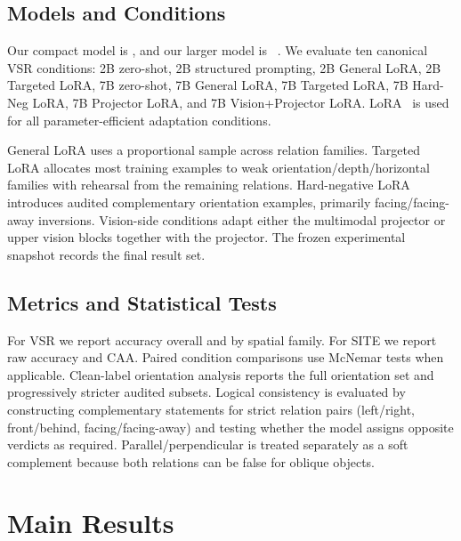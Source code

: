 \subsection{Models and Conditions}
Our compact model is \modelsmall{}, and our larger model is \modellarge{}~\cite{wang2024qwen2vl}. We evaluate ten canonical VSR conditions: 2B zero-shot, 2B structured prompting, 2B General LoRA, 2B Targeted LoRA, 7B zero-shot, 7B General LoRA, 7B Targeted LoRA, 7B Hard-Neg LoRA, 7B Projector LoRA, and 7B Vision+Projector LoRA. LoRA~\cite{hu2021lora} is used for all parameter-efficient adaptation conditions.

General LoRA uses a proportional sample across relation families. Targeted LoRA allocates most training examples to weak orientation/depth/horizontal families with rehearsal from the remaining relations. Hard-negative LoRA introduces audited complementary orientation examples, primarily facing/facing-away inversions. Vision-side conditions adapt either the multimodal projector or upper vision blocks together with the projector. The frozen experimental snapshot records the final result set.

\subsection{Metrics and Statistical Tests}
For VSR we report accuracy overall and by spatial family. For SITE we report raw accuracy and CAA. Paired condition comparisons use McNemar tests when applicable. Clean-label orientation analysis reports the full orientation set and progressively stricter audited subsets. Logical consistency is evaluated by constructing complementary statements for strict relation pairs (left/right, front/behind, facing/facing-away) and testing whether the model assigns opposite verdicts as required. Parallel/perpendicular is treated separately as a soft complement because both relations can be false for oblique objects.

\section{Main Results}
\label{sec:results}
